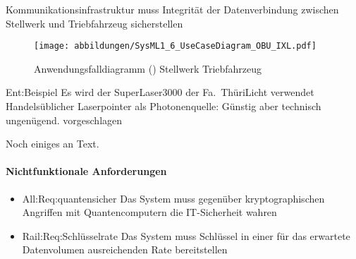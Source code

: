     {Kommunikationsinfrastruktur}
    {muss}
    {Integrität der Datenverbindung zwischen Stellwerk und Triebfahrzeug}
    {sicherstellen}

\begin{figure}[!htb]
  \centering
  \texttt{[image: abbildungen/SysML1\_6\_UseCaseDiagram\_OBU\_IXL.pdf]}
  \caption{Anwendungsfalldiagramm () Stellwerk Triebfahrzeug}
\end{figure}

\entscheidung
  {Ent:Beispiel} %
  {} %
  { Es wird der SuperLaser3000 der Fa.\ ThüriLicht verwendet} %
  { Handelsüblicher Laserpointer als Photonenquelle: Günstig aber technisch ungenügend.} %
  {vorgeschlagen} %

Noch einiges an Text.

\paragraph{Nichtfunktionale Anforderungen}

\begin{itemize}
    \item \anforderung
      {All:Req:quantensicher}
      {Das System}
      {muss}
      {gegenüber kryptographischen Angriffen mit Quantencomputern}
      {die IT-Sicherheit wahren}

    \item \anforderung
      {Rail:Req:Schlüsselrate}
      {Das System}
      {muss}
      {Schlüssel in einer für das erwartete Datenvolumen ausreichenden Rate}
      {bereitstellen}
\end{itemize}
